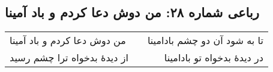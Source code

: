 \begin{center}
\section*{رباعی شماره ۲۸: من دوش دعا کردم و باد آمینا}
\label{sec:sh028}
\begin{longtable}{l p{0.5cm} r}
من دوش دعا کردم و باد آمینا
&&
تا به شود آن دو چشم بادامینا
\\
از دیدهٔ بدخواه ترا چشم رسید
&&
در دیدهٔ بدخواه تو بادامینا
\\
\end{longtable}
\end{center}
